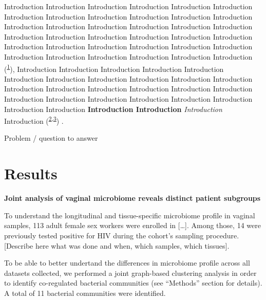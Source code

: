 \documentclass[
]{article}
\begin{document}
Introduction Introduction Introduction Introduction Introduction Introduction Introduction Introduction Introduction Introduction Introduction Introduction Introduction Introduction Introduction Introduction Introduction Introduction Introduction Introduction Introduction Introduction Introduction Introduction Introduction Introduction Introduction Introduction Introduction Introduction Introduction Introduction Introduction Introduction Introduction Introduction (\textsuperscript{\protect\hyperlink{ref-Johnston1972}{1}}), Introduction Introduction Introduction Introduction Introduction Introduction Introduction Introduction Introduction Introduction Introduction Introduction Introduction Introduction Introduction Introduction Introduction Introduction Introduction Introduction Introduction Introduction Introduction Introduction Introduction \textbf{Introduction Introduction} \emph{Introduction} Introduction (\textsuperscript{\protect\hyperlink{ref-Darwin1859}{2}}\textsuperscript{,}\textsuperscript{\protect\hyperlink{ref-Bumpus1898}{3}}) .

Problem / question to answer

\clearpage

\hypertarget{results}{%
\section{Results}\label{results}}

\textbf{Joint analysis of vaginal microbiome reveals distinct patient subgroups}

To understand the longitudinal and tissue-specific microbiome profile in vaginal samples, 113 adult female sex workers were enrolled in {[}\ldots{]}. Among those, 14 were previously tested positive for HIV during the cohort's sampling procedure. {[}Describe here what was done and when, which samples, which tissues{]}.

To be able to better undertand the differences in microbiome profile across all datasets collected, we performed a joint graph-based clustering analysis in order to identify co-regulated bacterial communities (see ``Methods'' section for details). A total of 11 bacterial communities were identified.
\end{document}
